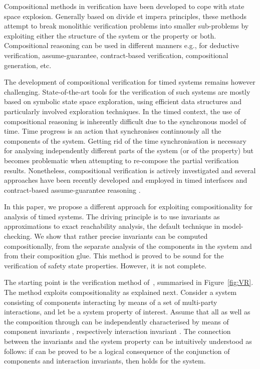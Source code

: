 \documentclass{LMCS}
\theoremstyle{plain}\newtheorem{remark}[thm]{Remark}
\theoremstyle{plain}\newtheorem{example}[thm]{Example}
\begin{document}
Compositional methods in verification have been developed to cope with
state space explosion. Generally based on divide et impera principles,
these methods attempt to break monolithic verification problems into
smaller sub-problems by exploiting either the structure of the system
or the property or both. Compositional reasoning can be used in
different manners e.g., for deductive verification, assume-guarantee,
contract-based verification, compositional generation, etc.

The development of compositional verification for timed systems
remains however challenging. State-of-the-art tools
\cite{uppaal,kronos,red06,Romeo2005} for the verification of such
systems are mostly based on symbolic state space exploration, using
efficient data structures and particularly involved exploration
techniques.  In the timed context, the use of compositional reasoning
is inherently difficult due to the synchronous model of time. Time
progress is an action that synchronises continuously all the
components of the system. Getting rid of the time synchronisation is
necessary for analysing independently different parts of the system
(or of the property) but becomes problematic when attempting to
re-compose the partial verification results.  Nonetheless,
compositional verification is actively investigated and several
approaches have been recently developed and employed in timed
interfaces \cite{Alfaro02} and contract-based assume-guarantee
reasoning \cite{Ecdar,AutomaticCompERAs}.

In this paper, we propose a different approach for exploiting
compositionality for analysis of timed systems. The driving principle
is to use invariants as approximations to exact reachability analysis,
the default technique in model-checking.  We show that rather
precise invariants can be computed compositionally, from the separate
analysis of the components in the system and from their composition
glue. This method is proved to be sound for the verification of safety
state properties. However, it is not complete.

The starting point is the verification method of~\cite{dfinder},
summarised in Figure~\ref{fig:VR}. The method exploits
compositionality as explained next. Consider a system consisting of
components  interacting by means of a set  of
multi-party interactions, and let  be a system property of
interest. Assume that all  as well as the composition through
 can be independently characterised by means of component
invariants , respectively interaction invariant
. The connection between the invariants and the system
property  can be intuitively understood as follows: if 
can be proved to be a logical consequence of the conjunction of
components and interaction invariants, then  holds for the
system.
\end{document}
